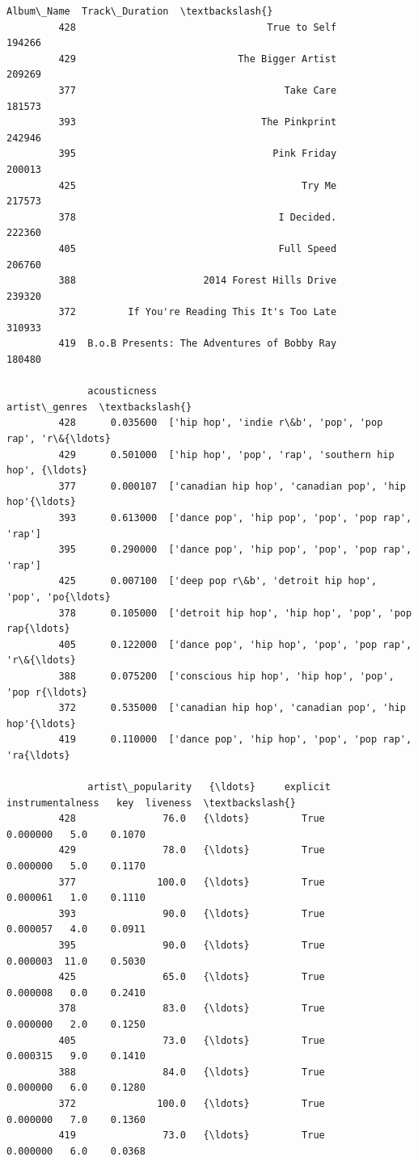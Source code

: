 \documentclass[11pt]{article}
\begin{document}
\begin{Verbatim}[commandchars=\\\{\}]
                                               Album\_Name  Track\_Duration  \textbackslash{}
         428                                 True to Self          194266   
         429                            The Bigger Artist          209269   
         377                                    Take Care          181573   
         393                                The Pinkprint          242946   
         395                                  Pink Friday          200013   
         425                                       Try Me          217573   
         378                                   I Decided.          222360   
         405                                   Full Speed          206760   
         388                      2014 Forest Hills Drive          239320   
         372         If You're Reading This It's Too Late          310933   
         419  B.o.B Presents: The Adventures of Bobby Ray          180480   
         
              acousticness                                      artist\_genres  \textbackslash{}
         428      0.035600  ['hip hop', 'indie r\&b', 'pop', 'pop rap', 'r\&{\ldots}   
         429      0.501000  ['hip hop', 'pop', 'rap', 'southern hip hop', {\ldots}   
         377      0.000107  ['canadian hip hop', 'canadian pop', 'hip hop'{\ldots}   
         393      0.613000  ['dance pop', 'hip pop', 'pop', 'pop rap', 'rap']   
         395      0.290000  ['dance pop', 'hip pop', 'pop', 'pop rap', 'rap']   
         425      0.007100  ['deep pop r\&b', 'detroit hip hop', 'pop', 'po{\ldots}   
         378      0.105000  ['detroit hip hop', 'hip hop', 'pop', 'pop rap{\ldots}   
         405      0.122000  ['dance pop', 'hip hop', 'pop', 'pop rap', 'r\&{\ldots}   
         388      0.075200  ['conscious hip hop', 'hip hop', 'pop', 'pop r{\ldots}   
         372      0.535000  ['canadian hip hop', 'canadian pop', 'hip hop'{\ldots}   
         419      0.110000  ['dance pop', 'hip hop', 'pop', 'pop rap', 'ra{\ldots}   
         
              artist\_popularity   {\ldots}     explicit  instrumentalness   key  liveness  \textbackslash{}
         428               76.0   {\ldots}         True          0.000000   5.0    0.1070   
         429               78.0   {\ldots}         True          0.000000   5.0    0.1170   
         377              100.0   {\ldots}         True          0.000061   1.0    0.1110   
         393               90.0   {\ldots}         True          0.000057   4.0    0.0911   
         395               90.0   {\ldots}         True          0.000003  11.0    0.5030   
         425               65.0   {\ldots}         True          0.000008   0.0    0.2410   
         378               83.0   {\ldots}         True          0.000000   2.0    0.1250   
         405               73.0   {\ldots}         True          0.000315   9.0    0.1410   
         388               84.0   {\ldots}         True          0.000000   6.0    0.1280   
         372              100.0   {\ldots}         True          0.000000   7.0    0.1360   
         419               73.0   {\ldots}         True          0.000000   6.0    0.0368   
         

\end{Verbatim}
\end{document}
